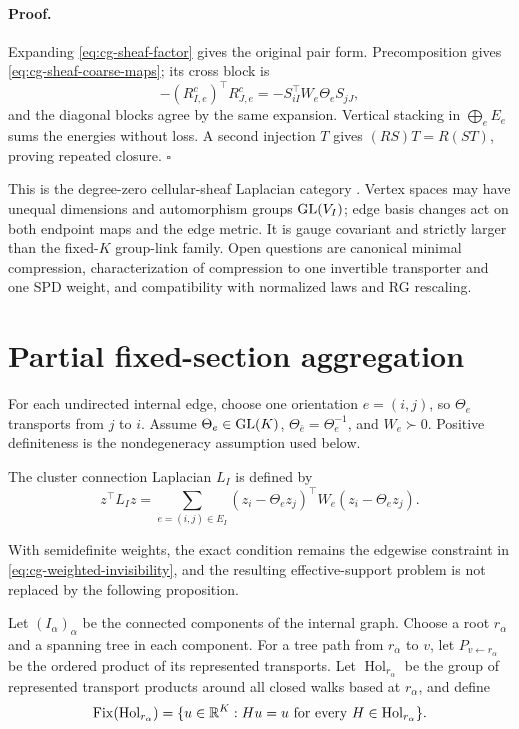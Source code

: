 \paragraph{Proof.}
Expanding \eqref{eq:cg-sheaf-factor} gives the original pair form.
Precomposition gives \eqref{eq:cg-sheaf-coarse-maps}; its cross block is
\[
-(R^c_{I,e})^\top R^c_{J,e}
=-S_{iI}^\top W_e\Theta_eS_{jJ},
\]
and the diagonal blocks agree by the same expansion. Vertical stacking in
\(\bigoplus_eE_e\) sums the energies without loss. A second injection \(T\)
gives \((RS)T=R(ST)\), proving repeated closure. \(\square\)

This is the degree-zero cellular-sheaf Laplacian category
\citep{HansenGhrist2019}. Vertex spaces may have unequal dimensions and
automorphism groups \(\mathrm{GL}(V_I)\); edge basis changes act on both endpoint
maps and the edge metric. It is gauge covariant and strictly larger than the
fixed-\(K\) group-link family. Open questions are canonical minimal
compression, characterization of compression to one invertible transporter
and one SPD weight, and compatibility with normalized laws and RG rescaling.

\section{Partial fixed-section aggregation}
\label{sec:cg-partial}

For each undirected internal edge, choose one orientation \(e=(i,j)\), so
\(\Theta_e\) transports from \(j\) to \(i\). Assume
\(\Theta_e\in\mathrm{GL}(K)\), \(\Theta_{\bar e}=\Theta_e^{-1}\), and
\(W_e\succ0\). Positive definiteness is the nondegeneracy assumption used
below. 

The cluster connection Laplacian \(L_I\) is defined by
\begin{equation}
z^\top L_Iz
=\sum_{e=(i,j)\in E_I}
(z_i-\Theta_ez_j)^\top W_e(z_i-\Theta_ez_j).
\label{eq:cg-connection-laplacian-energy}
\end{equation}

With semidefinite weights, the exact condition remains the edgewise constraint
in \eqref{eq:cg-weighted-invisibility}, and the resulting effective-support
problem is not replaced by the following proposition. 

Let \((I_\alpha)_\alpha\) be the connected components of the internal graph.
Choose a root \(r_\alpha\) and a spanning tree in each component. For a tree
path from \(r_\alpha\) to \(v\), let \(P_{v\leftarrow r_\alpha}\) be the
ordered product of its represented transports. Let
\(\operatorname{Hol}_{r_\alpha}\) be the group of represented transport
products around all closed walks based at \(r_\alpha\), and define
\begin{equation}
\operatorname{Fix}(\operatorname{Hol}_{r_\alpha})
=\{u\in\mathbb R^K:Hu=u\text{ for every }
H\in\operatorname{Hol}_{r_\alpha}\}.
\label{eq:cg-holonomy-fixed-space}
\end{equation}

